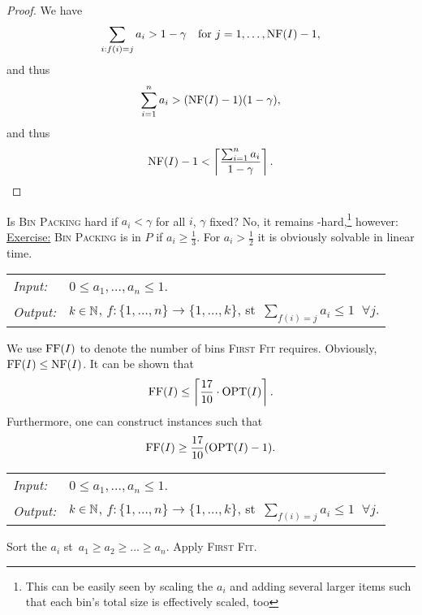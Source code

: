 \documentclass[../skript.tex]{subfiles}
\begin{document}
\begin{proof}\tabularnewline
We have
\[
	\sum_{i \mathrel{}:\mathrel{} f(i) = j} a_i > 1-\gamma \quad \text{for } j = 1, \ldots, \operatorname{NF}(I) -1,
\]
and thus
\[
	\sum_{i=1}^n a_i > (\operatorname{NF}(I) - 1)(1-\gamma),
\]
and thus
\[
	\operatorname{NF}(I) - 1 < \left\lceil \frac{\sum_{i=1}^n a_i}{1-\gamma} \right\rceil.
\]
\end{proof}
Is \textsc{Bin Packing} hard if $a_i < \gamma$ for all $i$, $\gamma$ fixed? No, it remains \NP-hard,\footnote{This can be easily seen by scaling the $a_i$ and adding several larger items such that each bin's total size is effectively scaled, too} however:
\underline{Exercise:} \textsc{Bin Packing} is in $P$ if $a_i \geq \frac{1}{3}$. For $a_i > \frac{1}{2}$ it is obviously solvable in linear time.
\begin{samepage}
\begin{algorithmbox}
\begin{tabular}{@{}ll}
\textit{Input:} & $0 \leq a_1, \ldots, a_n \leq 1$. \\
\textit{Output:} & $k \in \mathbb{N}$, $f : \{ 1, \ldots, n\} \to \{ 1, \ldots, k\}$, \ac{st}\ $\sum_{f(i) = j} a_i \leq 1 \;\; \forall j$.
\end{tabular}
\end{algorithmbox}
\vspace{-7pt}
\begin{algorithm}[H]
\end{algorithm}
\vspace{-7pt}
\EndAlgorithmLine
\end{samepage}
We use $\operatorname{FF}(I)$ to denote the number of bins \textsc{First Fit} requires. Obviously, $\operatorname{FF}(I) \leq \operatorname{NF}(I)$.
It can be shown that
\[
	\operatorname{FF}(I) \leq \left\lceil \frac{17}{10} \cdot \operatorname{OPT}(I) \right\rceil.
\]
Furthermore, one can construct instances such that
\[
	\operatorname{FF}(I) \geq \frac{17}{10} (\operatorname{OPT}(I) - 1).
\]
\begin{samepage}
\begin{algorithmbox}
\begin{tabular}{@{}ll}
\textit{Input:} & $0 \leq a_1, \ldots, a_n \leq 1$. \\
\textit{Output:} & $k \in \mathbb{N}$, $f : \{ 1, \ldots, n\} \to \{ 1, \ldots, k\}$, \ac{st}\ $\sum_{f(i) = j} a_i \leq 1 \;\; \forall j$.
\end{tabular}
\end{algorithmbox}
\vspace{-7pt}
\begin{algorithm}[H]
Sort the $a_i$ \ac{st}\ $a_1 \geq a_2 \geq \ldots \geq a_n$.\;
Apply \textsc{First Fit}.
\end{algorithm}
\vspace{-7pt}
\EndAlgorithmLine
\end{samepage}
\end{document}

